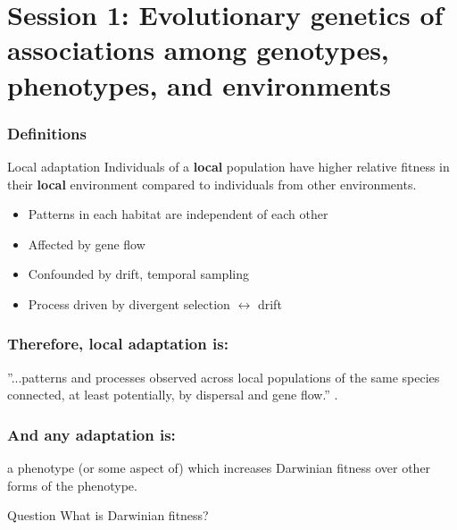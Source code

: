 
\section[Session 1]{Session 1: Evolutionary genetics of associations among
genotypes, phenotypes, and environments}

\begin{frame}
\frametitle{Definitions}
\begin{block}{Local adaptation}
\centering
Individuals of a \textbf{local} population have higher relative fitness in 
their \textbf{local} environment compared to individuals from other 
environments.
\end{block}

\begin{block}{}
\begin{itemize}
\item{Patterns in each habitat are independent of each other}
\item{Affected by gene flow}
\item{Confounded by drift, temporal sampling}
\item{Process driven by divergent selection $\longleftrightarrow$ drift}
\end{itemize}
\end{block}
\tiny
\citet{Kawecki:2004hxa}
\end{frame}

\begin{frame}
\frametitle{Therefore, local adaptation is:}
\Large
\begin{block}{}
''...patterns and processes observed across local populations of the same
species connected, at least potentially, by dispersal and gene flow.''
\citep{Kawecki:2004hxa}.
\end{block}
\end{frame}

\begin{frame}
\frametitle{And any adaptation is:}
\Large
\begin{block}{}
a phenotype (or some aspect of) which increases Darwinian fitness over other 
forms of the phenotype.
\end{block}

\begin{block}{Question}
\centering
What is Darwinian fitness?
\end{block}
\end{frame}

